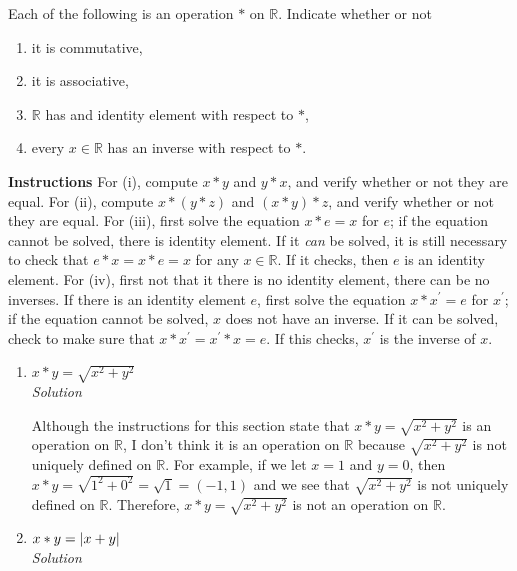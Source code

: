 \documentclass[12pt]{article}
\DeclarePairedDelimiter{\abs}{\lvert}{\rvert}
\begin{document}
\begin{flushleft}
Each of the following is an operation $*$ on $\mathbb{R}$. Indicate whether or not

\renewcommand{\theenumi}{(\roman{enumi})}
\begin{enumerate}
  \item it is commutative,
  \item it is associative,
  \item $\mathbb{R}$ has and identity element with respect to $*$,
  \item every $x \in \mathbb{R}$ has an inverse with respect to $*$.
\end{enumerate}

\textbf{Instructions} For (i), compute $x * y$ and $y * x$, and verify whether or not they are equal. For (ii), compute $x * (y * z)$ and $(x * y) * z$, and verify whether or not they are equal. For (iii), first solve the equation $x * e = x$ for $e$; if the equation cannot be solved, there is identity element. If it \textit{can} be solved, it is still necessary to check that $e * x = x * e = x$ for any $x \in \mathbb{R}$. If it checks, then $e$ is an identity element. For (iv), first not that it there is no identity element, there can be no inverses. If there is an identity element $e$, first solve the equation $x * x^{'} = e$ for $x^{'}$; if the equation cannot be solved, $x$ does not have an inverse. If it can be solved, check to make sure that $x * x^{'} = x^{'} * x = e$. If this checks, $x^{'}$ is the inverse of $x$.


\renewcommand{\theenumi}{\arabic{enumi})}
\begin{enumerate}



\item $x * y = \sqrt{x^2 + y^2}$ \\
\medskip
\textit{Solution}

Although the instructions for this section state that $x * y = \sqrt{x^2 + y^2}$ is an operation on $\mathbb{R}$, I don't think it is an operation on  $\mathbb{R}$ because $\sqrt{x^2 + y^2}$ is not uniquely defined on $\mathbb{R}$. For example, if we let $x = 1$ and $y = 0$, then $x * y = \sqrt{1^2 + 0^2} = \sqrt{1} = (-1, 1)$ and we see that $\sqrt{x^2 + y^2}$ is not uniquely defined on $\mathbb{R}$. Therefore, $x * y = \sqrt{x^2 + y^2}$ is not an operation on $\mathbb{R}$. \\

\item $x * y = \abs{ x + y }$ \\
\medskip
\textit{Solution}
\medskip


\end{enumerate}
\end{flushleft}
\end{document}
